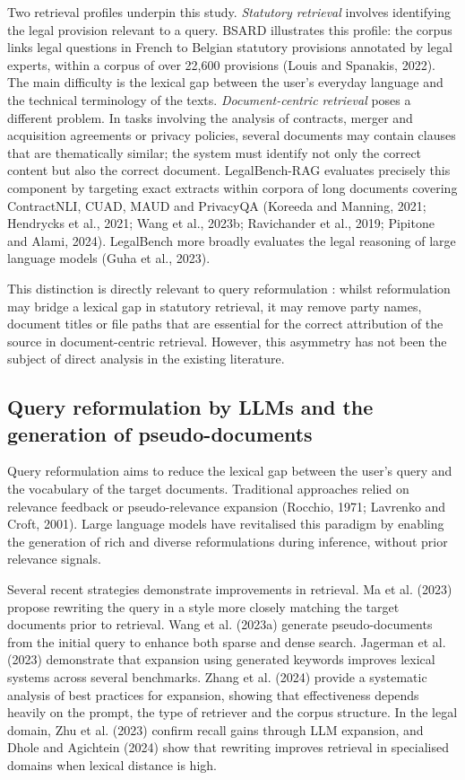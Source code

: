 \documentclass[a4paper,fleqn]{cas-dc}
\begin{document}
Two retrieval profiles underpin this study.
\textit{Statutory retrieval} involves identifying the
legal provision relevant to a query. BSARD illustrates this profile: the corpus
links legal questions in French to Belgian statutory provisions
annotated by legal experts, within a corpus of over
22,600 provisions (Louis and Spanakis, 2022). The main difficulty
is the lexical gap between the user’s everyday language and the
technical terminology of the texts. \textit{Document-centric retrieval}
poses a different problem. In tasks
involving the analysis of contracts, merger and acquisition agreements or
privacy policies, several documents may contain clauses
that are thematically similar; the system must identify not only the
correct content but also the correct document. LegalBench-RAG evaluates
precisely this component by targeting exact extracts within
corpora of long documents covering ContractNLI, CUAD, MAUD and
PrivacyQA (Koreeda and Manning, 2021; Hendrycks et al., 2021;
Wang et al., 2023b; Ravichander et al., 2019; Pipitone and Alami,
2024). LegalBench more broadly evaluates the legal reasoning of
large language models (Guha et al., 2023).

This distinction is directly relevant to query reformulation
: whilst reformulation may bridge a lexical gap in
statutory retrieval, it may remove party names,
document titles or file paths that are essential for
the correct attribution of the source in document-centric retrieval.
However, this asymmetry has not been the subject of direct analysis in the
existing literature.

\subsection{Query reformulation by LLMs and the generation of
pseudo-documents}

Query reformulation aims to reduce the lexical gap between the
user’s query and the vocabulary of the target documents. 
Traditional approaches relied on relevance feedback or
pseudo-relevance expansion (Rocchio, 1971; Lavrenko and Croft,
2001). Large language models have revitalised this paradigm by
enabling the generation of rich and diverse reformulations
during inference, without prior relevance signals.

Several recent strategies demonstrate improvements in retrieval.
Ma et al. (2023) propose rewriting the query in a style more
closely matching the target documents prior to retrieval. Wang et al. (2023a)
generate pseudo-documents from the initial query to
enhance both sparse and dense search. Jagerman et al. (2023) demonstrate
that expansion using generated keywords improves lexical systems
across several benchmarks. Zhang et al. (2024) provide a systematic analysis
of best practices for expansion, showing that
effectiveness depends heavily on the prompt, the type of retriever and
the corpus structure. In the legal domain, Zhu et al. (2023)
confirm recall gains through LLM expansion, and Dhole and
Agichtein (2024) show that rewriting improves retrieval
in specialised domains when lexical distance is high.
\end{document}
